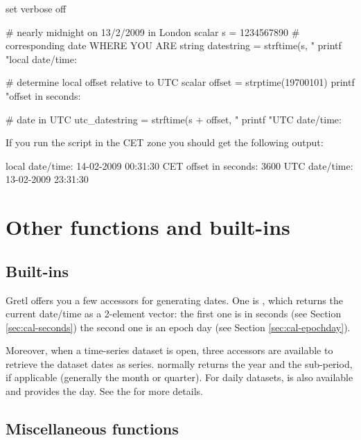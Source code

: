 \begin{script}[htbp]
  \label{ex:tzoffset}
\begin{scodebit}
set verbose off

# nearly midnight on 13/2/2009 in London
scalar s = 1234567890
# corresponding date WHERE YOU ARE
string datestring = strftime(s, "%
printf "local date/time: %

# determine local offset relative to UTC
scalar offset = strptime(19700101)
printf "offset in seconds: %

# date in UTC
utc_datestring = strftime(s + offset, "%
printf "UTC date/time: %
\end{scodebit}
If you run the script in the CET zone you should get the following
output:
\begin{outbit}
local date/time: 14-02-2009 00:31:30 CET
offset in seconds: 3600
UTC date/time: 13-02-2009 23:31:30
\end{outbit}
\end{script}

\section{Other functions and built-ins}
\label{sec:cal-otherfuncs}

\subsection{Built-ins}
\label{sec:cal-builtins}

Gretl offers you a few accessors for generating dates. One is
, which returns the current date/time as a 2-element
vector: the first one is in seconds (see Section
\ref{sec:cal-seconds}) the second one is an epoch day (see Section
\ref{sec:cal-epochday}).

Moreover, when a time-series dataset is open, three accessors are
available to retrieve the dataset dates as series. 
normally returns the year and  the sub-period, if
applicable (generally the month or quarter). For daily datasets,
 is also available and provides the day. See the
\GCR{} for more details.

\subsection{Miscellaneous functions}
\label{sec:cal-misc}

